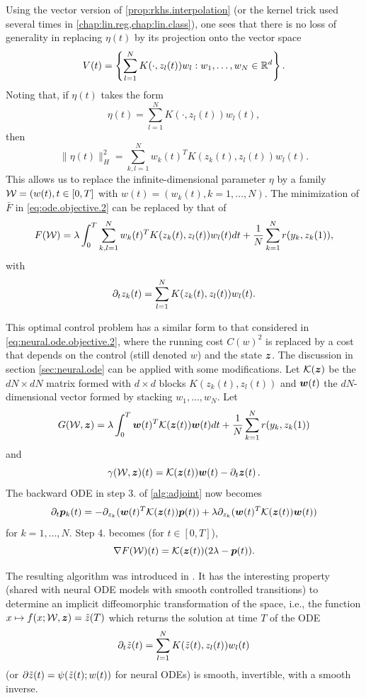 Using the vector version of \cref{prop:rkhs.interpolation} (or the kernel trick used several times in \cref{chap:lin.reg,chap:lin.class}), one sees that there is no loss of generality in replacing $\eta(t)$ by its projection onto the vector space
\[
V(t) = \left\{ \sum_{l=1}^N K(\cdot, z_l(t))w_l: w_1, \ldots, w_N\in {\mathbb{R}}^d \right\}.
\]
Noting that, if $\eta(t)$ takes the form 
\[
\eta(t) = \sum_{l=1}^N K(\cdot, z_l(t)) w_l(t),
\]
then
\[
\|\eta(t)\|^2_H = \sum_{k,l=1}^N w_k(t)^T K(z_k(t), z_l(t))w_l(t).
\]
This  allows us to replace the infinite-dimensional parameter $\eta$ by a family ${\mathcal W} = (w(t), t\in [0,T]$ with $w(t) = (w_k(t), k=1, \ldots, N)$. The minimization of $\bar F$ in \cref{eq:ode.objective.2} can be replaced by that of
\begin{equation}
\label{eq:ode.objective.3}
F({\mathcal W}) = \lambda \int_0^T \sum_{k,l=1}^N  w_k(t)^T K(z_k(t), z_l(t))w_l(t) dt + \frac1N \sum_{k=1}^N r(y_k, z_k(1)),
\end{equation}
with 
\[
\partial_t z_k(t) = \sum_{l=1}^N K(z_k(t), z_l(t)) w_l(t).
\]

This optimal control problem has a similar form to that considered in  \cref{eq:neural.ode.objective.2}, where the running cost $C(w)^2$ is replaced by a cost that depends on the control (still denoted $w$) and the state ${\bm{z}}$. The discussion in section \cref{sec:neural.ode} can be applied with some modifications.
Let ${\mathcal K}({\bm{z}})$ be the $dN \times dN$ matrix formed with $d\times d$ blocks $K(z_k(t), z_l(t))$ and ${\bm{w}}(t)$ the $dN$-dimensional vector formed by stacking $w_1, \ldots, w_N$. Let
\[
G({\mathcal W}, {\bm{z}}) = \lambda \int_0^T {\bm{w}}(t)^T {\mathcal K}({\bm{z}}(t)){\bm{w}}(t) dt + \frac1N \sum_{k=1}^N r(y_k, z_k(1))
\]
and
\[
\gamma({\mathcal W}, {\bm{z}})(t) = {\mathcal K}({\bm{z}}(t)){\bm{w}}(t)- \partial_t {\bm{z}}(t)\,.
\]
The backward ODE in step 3. of \cref{alg:adjoint} now becomes
\[
\partial_t {\bm{p}}_k(t) = -\partial_{z_k} ({\bm{w}}(t)^T {\mathcal K}({\bm{z}}(t)){\bm{p}}(t)) + \lambda \partial_{z_k} ({\bm{w}}(t)^T {\mathcal K}({\bm{z}}(t)){\bm{w}}(t))
\]
for $k=1, \ldots, N$.
Step 4. becomes (for $t\in [0,T]$),
\[
\nabla F({\mathcal W})(t) = {\mathcal K}({\bm{z}}(t)) (2\lambda  -  {\bm{p}}(t)).
\]

The resulting algorithm was introduced in \citep{younes2020diffeomorphic}. It has the interesting property (shared with neural ODE models with smooth controlled transitions) to determine an implicit diffeomorphic transformation of the space, i.e., the function $x\mapsto f(x; {\mathcal W}, {\bm{z}}) = \tilde z(T)$ which returns the solution at time $T$ of the ODE 
\[
\partial_t \tilde z(t) =  \sum_{l=1}^N K(\tilde z(t), z_l(t)) w_l(t)
\]
(or $\partial \tilde z(t) = \psi(\tilde z(t); w(t))$ for neural ODEs) is smooth, invertible, with a smooth inverse.








 



